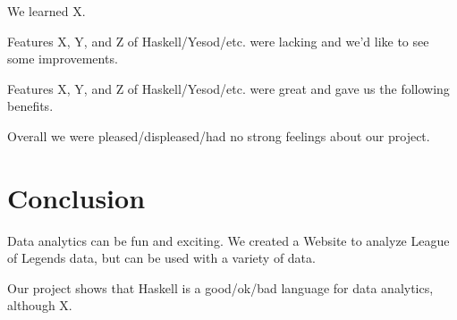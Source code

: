 \documentclass{chi2009}
\begin{document}
We learned X.

Features X, Y, and Z of Haskell/Yesod/etc. were lacking and we'd like to see some improvements.

Features X, Y, and Z of Haskell/Yesod/etc. were great and gave us the following benefits.

Overall we were pleased/displeased/had no strong feelings about our project.

\section{Conclusion}
\label{conclusion}

Data analytics can be fun and exciting. We created a Website to analyze League of Legends data, but can be used with a variety of data.

Our project shows that Haskell is a good/ok/bad language for data analytics, although X. 



\end{document}
